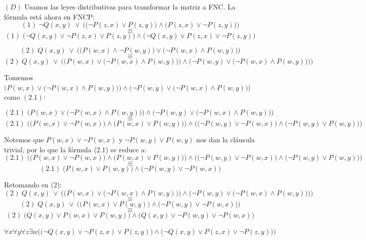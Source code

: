 \documentclass[12pt,letterpaper]{article}
\begin{document}
\begin{enumerate}
  $(D)$ Usamos las leyes distributivas para transformar la matriz a FNC. La f\'{o}rmula est\'{a} ahora en FNCP: \checkmark
  \[
  (1)\; \neg Q(x,y) \: \lor \: \Big( \big(\neg P(z,x) \lor P(z,y) \big) \land \big(P(z,x) \lor \neg P(z,y) \big) \Big)
  \]
  \[
  \equiv
  \]
  \[
  (1)\; \big(\neg Q(x,y) \lor \neg P(z,x) \lor P(z,y) \big) \land \big(\neg Q(x,y) \lor P(z,x) \lor \neg P(z,y) \big)
  \]
  
  \[
  (2)\; Q(x,y) \: \lor \: \Big( \big(P(w,x) \land \neg P(w,y) \big) \lor \big(\neg P(w,x) \land P(w,y) \big) \Big)
  \]
  \[
  \equiv
  \]
  \[
  (2)\; Q(x,y) \: \lor \: \bigg( \Big(P(w,x) \lor \big(\neg P(w,x) \land P(w,y) \big) \Big) \land \Big(\neg P(w,y) \lor \big(\neg P(w,x) \land P(w,y) \big) \Big) \bigg)
  \]
  
  Tomemos $\Big(P(w,x) \lor \big(\neg P(w,x) \land P(w,y) \big) \Big) \land \Big(\neg P(w,y) \lor \big(\neg P(w,x) \land P(w,y) \big) \Big)$ como $(2.1)$:

  \[
  (2.1)\; \Big(P(w,x) \lor \big(\neg P(w,x) \land P(w,y) \big) \Big) \land \Big(\neg P(w,y) \lor \big(\neg P(w,x) \land P(w,y) \big) \Big)
  \]
  \[
  \equiv
  \]
  \[
  (2.1)\; \Big(\big(P(w,x) \lor \neg P(w,x) \big) \land \big(P(w,x) \lor P(w,y) \big) \Big) \land \Big(\big(\neg P(w,y) \lor \neg P(w,x)\big) \land \big(\neg P(w,y) \lor P(w,y) \big) \Big)
  \]

  Notemos que $P(w,x) \lor \neg P(w,x)$ y $\neg P(w,y) \lor P(w,y)$ nos dan la cl\'{a}usula trivial, por lo que la f\'{o}rmula (2.1) se reduce a:
  \[
  (2.1)\; \Big(\big(P(w,x) \lor \neg P(w,x) \big) \land \big(P(w,x) \lor P(w,y) \big) \Big) \land \Big(\big(\neg P(w,y) \lor \neg P(w,x)\big) \land \big(\neg P(w,y) \lor P(w,y) \big) \Big)
  \]
  \[
  \equiv
  \]
  \[
   (2.1)\; \big(P(w,x) \lor P(w,y) \big) \land \big(\neg P(w,y) \lor \neg P(w,x)\big)
  \]

  Retomando en (2):
  \[
  (2)\; Q(x,y) \: \lor \: \bigg( \Big(P(w,x) \lor \big(\neg P(w,x) \land P(w,y) \big) \Big) \land \Big(\neg P(w,y) \lor \big(\neg P(w,x) \land P(w,y) \big) \Big) \bigg)
  \]
  \[
  \equiv
  \]
  \[
  (2)\; Q(x,y) \: \lor \: \Big( \big(P(w,x) \lor P(w,y) \big) \land \big(\neg P(w,y) \lor \neg P(w,x)\big) \Big)
  \]
  \[
  \equiv
  \]
  \[
  (2)\; \big(Q(x,y) \lor P(w,x) \lor P(w,y) \big) \land \big(Q(x,y) \lor \neg P(w,y) \lor \neg P(w,x)\big)
  \]

  \quad {} $\forall x \forall y \forall z \exists w \Big(\big(\neg Q(x,y) \lor \neg P(z,x) \lor P(z,y) \big) \land \big(\neg Q(x,y) \lor P(z,x) \lor \neg P(z,y) \big) \Big)$


\end{enumerate}
\end{document}
